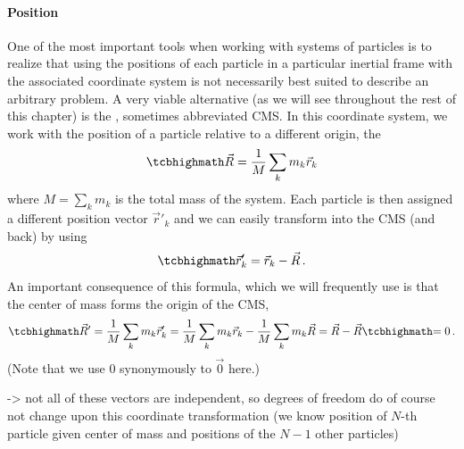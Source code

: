 \documentclass[../class_mech_main.tex]{subfiles}
\begin{document}
			\paragraph{Position}
One of the most important tools when working with systems of particles is to realize that using the positions of each particle in a particular inertial frame with the associated coordinate system is not necessarily best suited to describe an arbitrary problem. A very viable alternative (as we will see throughout the rest of this chapter) is the , sometimes abbreviated CMS. In this coordinate system, we work with the position of a particle relative to a different origin, the 
\begin{equation}\label{eq:center_of_mass_definition}
	\eqbox{
		\vec{R} = \frac{1}{M} \sum_k m_k \vec{r}_k
	}
\end{equation}
where $M = \sum_k m_k$ is the total mass of the system. Each particle is then assigned a different position vector $\vec{r}'_k$ and we can easily transform into the CMS (and back) by using
\begin{equation}
	\eqbox{
		\vec{r}'_k = \vec{r}_k - \vec{R}
	} \, .
\end{equation}
An important consequence of this formula, which we will frequently use is that the center of mass forms the origin of the CMS,
\begin{equation}
	\eqbox{
		\vec{R}'
	}= \frac{1}{M} \sum_k m_k \vec{r}'_k = \frac{1}{M} \sum_k m_k \vec{r}_k - \frac{1}{M} \sum_k m_k \vec{R} = \vec{R} - \vec{R}
	\eqbox{
		= 0
	} \, .
\end{equation}
(Note that we use $0$ synonymously to $\vec{0}$ here.)

-> not all of these vectors are independent, so degrees of freedom do of course not change upon this coordinate transformation (we know position of $N$-th particle given center of mass and positions of the $N-1$ other particles)
\end{document}
